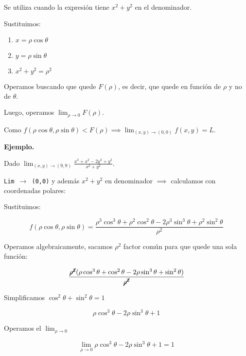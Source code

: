 Se utiliza cuando la expresión tiene \(x^{2} + y^{2}\) en el denominador.

Sustituimos:
\begin{enumerate}
    \item \(x = \rho \cos\theta\)
    \item \(y = \rho \sin\theta\)
    \item \(x^{2} + y^{2} = \rho^{2}\)
\end{enumerate}

Operamos buscando que quede \(F(\rho)\),
es decir, que quede en función de \(\rho\) y no de \(\theta\).

Luego, operamos \(\lim_{\rho\to0} F(\rho)\).

Como \(f(\rho\cos\theta,\rho\sin\theta) < F(\rho) \implies \lim_{(x,y)\to(0,0)}f(x,y) = L\).

\textbf{Ejemplo.}

Dado \(\lim_{(x,y)\to(9,9)}\frac{x^{3} + x^{2} - 2y^{3} + y^{2}}{x^{2} + y^{2}}\).

\texttt{Lim \(\to\) (0,0)} y además \texttt{\(x^{2} + y^{2}\)} en denominador \(\implies\) calculamos con coordenadas polares:

Sustituimos:

\begin{equation*}
    f(\rho\cos\theta,\rho\sin\theta) = \frac{\rho^{3}\cos^{3}\theta + \rho^{2}\cos^{2}\theta - 2\rho^{3}\sin^{3}\theta + \rho^{2}\sin^{2}\theta}{\rho^{2}}
\end{equation*}

Operamos algebraicamente, sacamos \(\rho^{2}\) factor común para que quede una sola función:

\begin{equation*}
    \frac{\cancel{\rho^{2}}(\rho\cos^{3}\theta + \cos^{2}\theta - 2\rho\sin^{3}\theta + \sin^{2}\theta)}{\cancel{\rho^{2}}}
\end{equation*}

Simplificamos \(\cos^{2}\theta + \sin^{2}\theta = 1\)

\begin{equation*}
    \rho\cos^{3}\theta - 2\rho\sin^{3}\theta + 1
\end{equation*}

Operamos el \(\lim_{\rho\to0}\)

\begin{equation*}
    \lim_{\rho\to0}\rho\cos^{3}\theta - 2\rho\sin^{3}\theta + 1 = \boxed{1}
\end{equation*}

